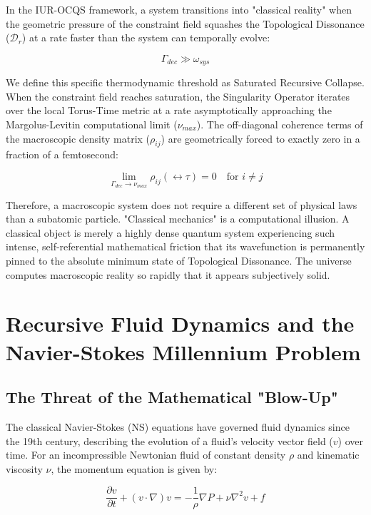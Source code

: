 \documentclass[12pt,openany]{book}
\begin{document}
In the IUR-OCQS framework, a system transitions into "classical reality" when the geometric pressure of the constraint field squashes the Topological Dissonance ($\mathcal{D}_r$) at a rate faster than the system can temporally evolve:

\begin{equation}
\Gamma_{dec} \gg \omega_{sys}
\end{equation}

We define this specific thermodynamic threshold as Saturated Recursive Collapse. When the constraint field reaches saturation, the Singularity Operator iterates over the local Torus-Time metric at a rate asymptotically approaching the Margolus-Levitin computational limit ($\nu_{max}$). The off-diagonal coherence terms of the macroscopic density matrix ($\rho_{ij}$) are geometrically forced to exactly zero in a fraction of a femtosecond:

\begin{equation}
\lim_{\Gamma_{dec} \to \nu_{max}} \rho_{ij}(\leftrightarrow\tau) = 0 \quad \text{for } i \ne j
\end{equation}

Therefore, a macroscopic system does not require a different set of physical laws than a subatomic particle. "Classical mechanics" is a computational illusion. A classical object is merely a highly dense quantum system experiencing such intense, self-referential mathematical friction that its wavefunction is permanently pinned to the absolute minimum state of Topological Dissonance. The universe computes macroscopic reality so rapidly that it appears subjectively solid.

\chapter{Recursive Fluid Dynamics and the Navier-Stokes Millennium Problem}

\section{The Threat of the Mathematical "Blow-Up"}
The classical Navier-Stokes (NS) equations have governed fluid dynamics since the 19th century, describing the evolution of a fluid's velocity vector field ($v$) over time. For an incompressible Newtonian fluid of constant density $\rho$ and kinematic viscosity $\nu$, the momentum equation is given by:

\begin{equation}
\frac{\partial v}{\partial t} + (v \cdot \nabla)v = -\frac{1}{\rho}\nabla P + \nu\nabla^2v + f
\end{equation}
\end{document}
